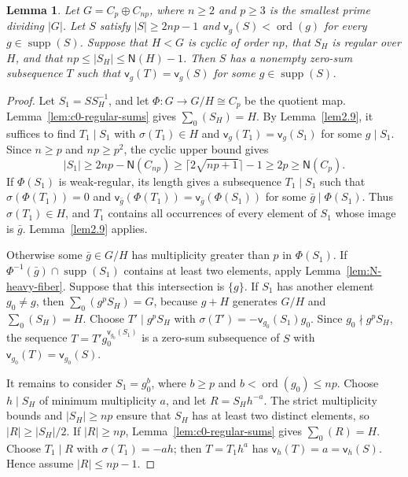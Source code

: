 \documentclass[10pt,a4paper]{amsart}
\newtheorem{lem}[thm]{Lemma}
\theoremstyle{definition}
\theoremstyle{remark}
\numberwithin{equation}{section}
\DeclareMathOperator{\ord}{ord}
\DeclareMathOperator{\supp}{supp}
\begin{document}
\begin{lem}\label{lem:N-index-p-complete}
Let $G=C_p\oplus C_{np}$, where $n\ge2$ and $p\ge3$ is the
smallest prime dividing $|G|$.
Let $S$ satisfy $|S|\ge2np-1$ and
$\mathsf v_g(S)<\ord(g)$ for every $g\in\supp(S)$.
Suppose that $H<G$ is cyclic of order $np$, that $S_H$ is regular
over $H$, and that $np\le|S_H|\le\mathsf N(H)-1$.
Then $S$ has a nonempty zero-sum subsequence $T$ such that
$\mathsf v_g(T)=\mathsf v_g(S)$ for some $g\in\supp(S)$.
\end{lem}

\begin{proof}
Let $S_1=SS_H^{-1}$, and let $\Phi:G\to G/H\cong C_p$ be the quotient map.
Lemma~\ref{lem:c0-regular-sums} gives $\sum_0(S_H)=H$.
By Lemma~\ref{lem2.9}, it suffices to find $T_1\mid S_1$
with $\sigma(T_1)\in H$ and $\mathsf v_g(T_1)=\mathsf v_g(S_1)$
for some $g\mid S_1$.
Since $n\ge p$ and $np\ge p^2$, the cyclic upper bound gives
\[
 |S_1|\ge2np-\mathsf N(C_{np})
 \ge\lceil2\sqrt{np+1}\rceil-1\ge2p\ge\mathsf N(C_p).
\]
If $\Phi(S_1)$ is weak-regular, its length gives a subsequence
$T_1\mid S_1$ such that $\sigma(\Phi(T_1))=0$ and
$\mathsf v_{\bar g}(\Phi(T_1))=\mathsf v_{\bar g}(\Phi(S_1))$
for some $\bar g\mid\Phi(S_1)$.
Thus $\sigma(T_1)\in H$, and $T_1$ contains all occurrences of every
element of $S_1$ whose image is $\bar g$. Lemma~\ref{lem2.9} applies.

Otherwise some $\bar g\in G/H$ has multiplicity greater than $p$
in $\Phi(S_1)$. If $\Phi^{-1}(\bar g)\cap\supp(S_1)$ contains at least
two elements, apply Lemma~\ref{lem:N-heavy-fiber}.
Suppose that this intersection is $\{g\}$.
If $S_1$ has another element $g_0\ne g$, then
$\sum_0(g^pS_H)=G$, because $g+H$ generates $G/H$ and
$\sum_0(S_H)=H$.
Choose $T'\mid g^pS_H$ with $\sigma(T')=-\mathsf v_{g_0}(S_1)g_0$.
Since $g_0\nmid g^pS_H$, the sequence
$T=T'g_0^{\mathsf v_{g_0}(S_1)}$ is a zero-sum subsequence of $S$
with $\mathsf v_{g_0}(T)=\mathsf v_{g_0}(S)$.

It remains to consider $S_1=g_0^b$, where $b\ge p$ and
$b<\ord(g_0)\le np$.
Choose $h\mid S_H$ of minimum multiplicity $a$, and let $R=S_Hh^{-a}$.
The strict multiplicity bounds and $|S_H|\ge np$ ensure that
$S_H$ has at least two distinct elements, so $|R|\ge|S_H|/2$.
If $|R|\ge np$, Lemma~\ref{lem:c0-regular-sums} gives $\sum_0(R)=H$.
Choose $T_1\mid R$ with $\sigma(T_1)=-ah$; then $T=T_1h^a$
has $\mathsf v_h(T)=a=\mathsf v_h(S)$.
Hence assume $|R|\le np-1$.


\end{proof}
\end{document}
